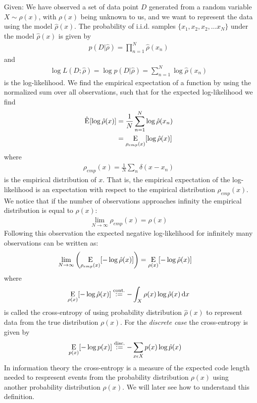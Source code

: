 \begin{proposition}
Given: We have observed a set of data point $D$ generated from a random variable $X \sim \rho(x)$, with
$\rho(x)$ being unknown to us, and we want to represent the data using the model $\hat{\rho}(x)$. 
The probability of i.i.d. samples $\{x_1, x_2, x_2, \dots x_N\}$
under the model $\hat{\rho}(x)$ is given by
\begin{align*}
	p(D|\hat{\rho}) = \prod_{n=1}^N \hat{\rho}(x_n)
\end{align*}
and 
\begin{align*}
	\log L(D;\hat{\rho}) = \log p(D|\hat{\rho}) = \sum_{n=1}^N \log \hat{\rho}(x_n)
\end{align*}
is the log-likelihood. We find the empirical expectation of a function by using the normalized
sum over all observations, such that for the expected log-likelihood we find
\begin{align}
	\begin{split}
	   \hat{\operatorname*{\mathrm{E}}}_{}[\log \hat{\rho}(x)] &= \frac{1}{N} \sum_{n=1}^N \log \hat{\rho}(x_n) \\
	   							     &= \operatorname*{\mathrm{E}}_{\rho_{emp}(x)}[\log \hat{\rho}(x)]
	\end{split}
\end{align}
where
\begin{align*}
	\rho_{emp}(x) = \frac{1}{N} \sum_n \delta(x - x_n)
\end{align*}
is the empirical distribution of $x$. That is, the empirical expectation of the log-likelihood
is an expectation with respect to the empirical distribution $\rho_{emp}(x)$. We notice that 
if the number of observations approaches infinity the empirical distribution is equal to
$\rho(x)$:
\begin{align*}
	\lim_{N \rightarrow \infty} \rho_{emp}(x) = \rho(x)
\end{align*}
Following this observation the expected negative log-likelihood for infinitely many observations
can be written as:
\begin{align*}
	\lim_{N \rightarrow \infty} \left( \operatorname*{\mathrm{E}}_{\rho_{emp}(x)}[- \log \hat{\rho}(x)] \right)
				&= \operatorname*{\mathrm{E}}_{\rho(x)}[- \log \hat{\rho}(x)] 
\end{align*}
where 
\begin{align}
	\operatorname*{\mathrm{E}}_{\rho(x)}[- \log \hat{\rho}(x)] \stackrel{\text{cont.}}{:=} - \int_{X}\rho(x) \log \hat{\rho}(x) \, \mathrm{d}x
\end{align}
is called the cross-entropy of using probability distribution $\hat{\rho}(x)$ to represent data
from the true distribution $\rho(x)$. For the \emph{discrete case} the cross-entropy is given by
\begin{align}
	\operatorname*{\mathrm{E}}_{p(x)}[- \log p(x)]
		&\stackrel{\text{disc.}}{:=} - \sum_{x \epsilon X} p(x) \log \hat{p}(x)
\end{align}
In information theory the cross-entropy is a measure of the expected code length needed to respresent
events from the probability distribution $\rho(x)$ using another probability distribution
$\hat{\rho}(x)$. We will later see how to understand this definition.
\end{proposition}

